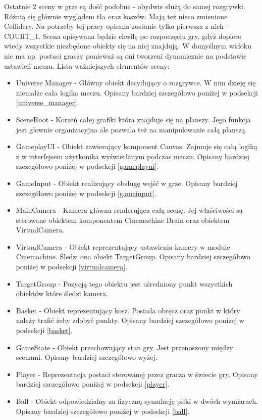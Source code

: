 \documentclass[a4paper,12pt,twoside,openany]{report}
\begin{document}
Ostatnie 2 sceny w grze są dość podobne - obydwie służą do samej rozgrywki. Różnią się głównie wyglądem tła oraz koszów. Mają też nieco zmienione Collidery. Na potrzeby tej pracy opisana zostanie tylko pierwsza z nich - COURT\_1. Scena opisywana będzie chwilę po rozpoczęciu gry, gdyż dopiero wtedy wszystkie niezbędone obiekty się na niej znajdują. W domyślnym widoku nie ma np. postaci graczy ponieważ są oni tworzeni dynamicznie na podstawie ustawień meczu. Lista ważniejszych elementów sceny:
\begin{itemize}
    \item Universe Manager - Główny obiekt decydujący o rozgrywce. W nim dzieję się niemalże cała logika meczu. Opisany bardziej szczegółowo poniżej w podsekcji \ref{universe_manager}.
    \item SceneRoot - Korzeń całej grafiki która znajduje się na planszy. Jego funkcja jest głownie organizacyjna ale pozwala też na manipulowanie całą planszą.
    \item GameplayUI - Obiekt zawierający komponent Canvas. Zajmuje się całą logiką z w interfejsem użytkonika wyświetlanym podczas meczu. Opisany bardziej szczegółowo poniżej w podsekcji \ref{gameplayui}.
    \item GameInput - Obiekt realizujący obsługę wejść w grze. Opisany bardziej szczegółowo poniżej w podsekcji \ref{gameinput}.
    \item MainCamera - Kamera główna renderująca całą scenę. Jej właściwości są sterowane obiektem komponentem Cinemachine Brain oraz obiektem VirtualCamera.
    \item VirtualCamera - Obiekt reprezentujący ustawienia kamery w module Cinemachine. Śledzi ona obiekt TargetGroup. Opisany bardziej szczegółowo poniżej w podsekcji \ref{virtualcamera}.
    \item TargetGroup - Pozycją tego obiektu jest uśredniony punkt wszystkich obiektów które śledzi kamera.
    \item Basket - Obiekt reprezentujący kosz. Posiada obręcz oraz punkt w który należy trafić żeby zdobyć punkty. Opisany bardziej szczegółowo poniżej w podsekcji \ref{basket}.
    \item GameState - Obiekt przechowujący stan gry. Jest przenoszony między scenami. Opisany bardziej szczegółowo wyżej.
    \item Player - Reprezentacja postaci sterowanej przez gracza w świecie gry. Opisany bardziej szczegółowo poniżej w podsekcji \ref{player}.
    \item Ball - Obiekt odpowiedzialny za fizyczną symulację piłki w dwóch wymiarach. Opisany bardziej szczegółowo poniżej w podsekcji \ref{ball}.

\end{itemize}
\end{document}
